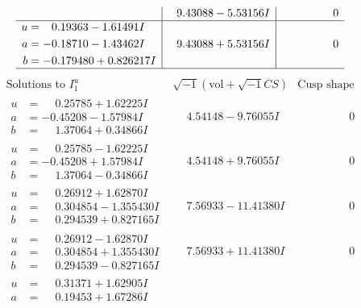 \documentclass[1p]{elsarticle_modified}
\theoremstyle{definition}
\newcommand{\I}{\sqrt{-1}}
\begin{document}
$$\begin{array}{c|c|c}
 & \phantom{-}9.43088 - 5.53156 I & \phantom{-0.000000 } 0 \\ \hline\begin{aligned}
u &= \phantom{-}0.19363 - 1.61491 I \\
a &= -0.18710 - 1.43462 I \\
b &= -0.179480 + 0.826217 I\end{aligned}
 & \phantom{-}9.43088 + 5.53156 I & \phantom{-0.000000 } 0\\
 \hline 
 \end{array}$$\newpage$$\begin{array}{c|c|c}  
\text{Solutions to }I^u_{1}& \I (\text{vol} + \sqrt{-1}CS) & \text{Cusp shape}\\
 \hline 
\begin{aligned}
u &= \phantom{-}0.25785 + 1.62225 I \\
a &= -0.45208 - 1.57984 I \\
b &= \phantom{-}1.37064 + 0.34866 I\end{aligned}
 & \phantom{-}4.54148 - 9.76055 I & \phantom{-0.000000 } 0 \\ \hline\begin{aligned}
u &= \phantom{-}0.25785 - 1.62225 I \\
a &= -0.45208 + 1.57984 I \\
b &= \phantom{-}1.37064 - 0.34866 I\end{aligned}
 & \phantom{-}4.54148 + 9.76055 I & \phantom{-0.000000 } 0 \\ \hline\begin{aligned}
u &= \phantom{-}0.26912 + 1.62870 I \\
a &= \phantom{-}0.304854 - 1.355430 I \\
b &= \phantom{-}0.294539 + 0.827165 I\end{aligned}
 & \phantom{-}7.56933 - 11.41380 I & \phantom{-0.000000 } 0 \\ \hline\begin{aligned}
u &= \phantom{-}0.26912 - 1.62870 I \\
a &= \phantom{-}0.304854 + 1.355430 I \\
b &= \phantom{-}0.294539 - 0.827165 I\end{aligned}
 & \phantom{-}7.56933 + 11.41380 I & \phantom{-0.000000 } 0 \\ \hline\begin{aligned}
u &= \phantom{-}0.31371 + 1.62905 I \\
a &= \phantom{-}0.19453 + 1.67286 I \\

\end{aligned}
\end{array}$$
\end{document}
